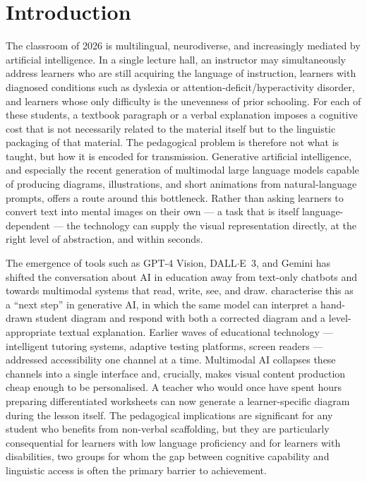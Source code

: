 %
%
\chapter{Introduction}
\label{chap:intro}
\setlength{\parskip}{1em}
%
The classroom of 2026 is multilingual, neurodiverse, and increasingly mediated by artificial intelligence. In a single lecture hall, an instructor may simultaneously address learners who are still acquiring the language of instruction, learners with diagnosed conditions such as dyslexia or attention-deficit/hyperactivity disorder, and learners whose only difficulty is the unevenness of prior schooling. For each of these students, a textbook paragraph or a verbal explanation imposes a cognitive cost that is not necessarily related to the material itself but to the linguistic packaging of that material. The pedagogical problem is therefore not what is taught, but how it is encoded for transmission. Generative artificial intelligence, and especially the recent generation of multimodal large language models capable of producing diagrams, illustrations, and short animations from natural-language prompts, offers a route around this bottleneck. Rather than asking learners to convert text into mental images on their own --- a task that is itself language-dependent --- the technology can supply the visual representation directly, at the right level of abstraction, and within seconds.

The emergence of tools such as GPT-4 Vision, DALL$\cdot$E~3, and Gemini has shifted the conversation about AI in education away from text-only chatbots and towards multimodal systems that read, write, see, and draw. \citet{bewersdorff2024} characterise this as a ``next step'' in generative AI, in which the same model can interpret a hand-drawn student diagram and respond with both a corrected diagram and a level-appropriate textual explanation. Earlier waves of educational technology --- intelligent tutoring systems, adaptive testing platforms, screen readers --- addressed accessibility one channel at a time. Multimodal AI collapses these channels into a single interface and, crucially, makes visual content production cheap enough to be personalised. A teacher who would once have spent hours preparing differentiated worksheets can now generate a learner-specific diagram during the lesson itself. The pedagogical implications are significant for any student who benefits from non-verbal scaffolding, but they are particularly consequential for learners with low language proficiency and for learners with disabilities, two groups for whom the gap between cognitive capability and linguistic access is often the primary barrier to achievement.

